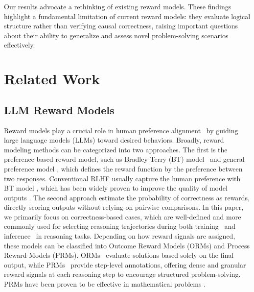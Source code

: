 \documentclass{article}
\begin{document}
Our results advocate a rethinking of existing reward models. These findings highlight a fundamental limitation of current reward models: they evaluate logical structure rather than verifying causal correctness, raising important questions about their ability to generalize and assess novel problem-solving scenarios effectively. 



\section{Related Work} \label{sec:related}

\subsection{LLM Reward Models}
Reward models play a crucial role in human preference alignment~\citep{christiano2017deep,bai2022training,casper2023open} by guiding large language models (LLMs) toward desired behaviors. Broadly, reward modeling methods can be categorized into two approaches.
The first is the preference-based reward model, such as Bradley-Terry (BT) model~\citep{bradley1952rank,zhao2023slic,rafailov2024direct,ethayarajh2024kto,xiong2024iterative} and general preference model \citep{llm-blender-2023,munos2023nash,tang2024generalized,ye2025online,azar2024general}, which defines the reward function by the preference between two responses.
Conventional RLHF usually capture the human preference with BT model \citep{ouyang2022training,chatgpt}, which has been widely proven to improve the quality of model outputs \citep{dubey2024llama,dong2024rlhf,guo2024direct}.
The second approach estimate the probability of correctness as rewards, directly scoring outputs without relying on pairwise comparisons. 
In this paper, we primarily focus on correctness-based cases, which are well-defined and more commonly used for selecting reasoning trajectories during both training~\citep{chen2024alphamath,wang2024math} and inference~\citep{brown2024large} in reasoning tasks. Depending on how reward signals are assigned, these models can be classified into Outcome Reward Models (ORMs) and Process Reward Models (PRMs). ORMs~\citep{yu2023outcome} evaluate solutions based solely on the final output, while PRMs~\citep{lightman2023let} provide step-level annotations, offering dense and granular reward signals at each reasoning step to encourage structured problem-solving. PRMs have been proven to be effective in mathematical problems \citep{shao2024deepseekmath,snell2024scaling,luo2024improve,liao2025reward}. 
\end{document}
